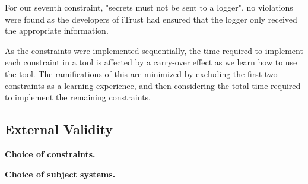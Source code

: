 For our seventh constraint, "secrets must not be sent to a logger", no violations were found as the developers of iTrust had ensured that the logger only received the appropriate information. 

As the constraints were implemented sequentially, the time required to implement each constraint in a tool is affected by a carry-over effect as we learn how to use the tool. The ramifications of this are minimized by excluding the first two constraints as a learning experience, and then considering the total time required to implement the remaining constraints.

\subsection{External Validity}

\textbf{Choice of constraints.} 

\textbf{Choice of subject systems.} 

